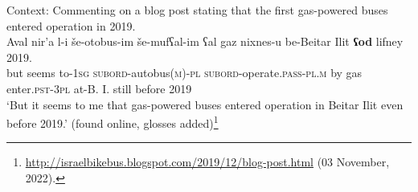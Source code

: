 \begin{exe}
	\ex\label{exAppendixHebrewOdTimeScalar1}
	\begin{xlist}
	\end{xlist}
	
	\ex Context: Commenting on a blog post stating that the first gas-powered buses entered operation in 2019.\\
	\gll Aval nir’a l-i še-otobus-im še-mufʕal-im ʕal gaz nixnes-u be-{Beitar Ilit} \textbf{ʕod} lifney 2019.\\
	but seems to-1\textsc{sg} \textsc{subord}-autobus(\textsc{m})-\textsc{pl} \textsc{subord}-operate.\textsc{pass}-\textsc{pl}.\textsc{m} by gas enter.\textsc{pst}-3\textsc{pl} at-{B. I.} still before 2019\\
	\glt \lq But it seems to me that gas-powered buses entered operation in Beitar Ilit even before 2019.\rq{ }(found online, glosses added)\footnote{\url{http://israelbikebus.blogspot.com/2019/12/blog-post.html} (03 November, 2022).}


\end{exe}
